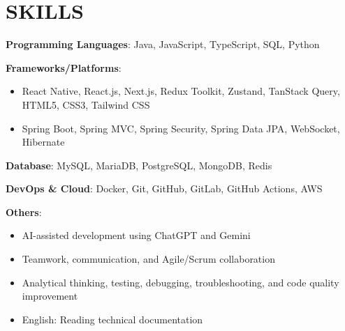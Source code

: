 \section{SKILLS}
\resumeSubHeadingListStart

  \item
    \resumeItemListStart
      \item \textbf{Programming Languages}: Java, JavaScript, TypeScript, SQL, Python
      \item \textbf{Frameworks/Platforms}:
        \begin{itemize}
          \item React Native, React.js, Next.js, Redux Toolkit, Zustand, TanStack Query, HTML5, CSS3, Tailwind CSS
          \item Spring Boot, Spring MVC, Spring Security, Spring Data JPA, WebSocket, Hibernate
        \end{itemize}
      \item \textbf{Database}: MySQL, MariaDB, PostgreSQL, MongoDB, Redis
      \item \textbf{DevOps \& Cloud}: Docker, Git, GitHub, GitLab, GitHub Actions, AWS
      \item \textbf{Others}:
        \begin{itemize}
          \item AI-assisted development using ChatGPT and Gemini
          \item Teamwork, communication, and Agile/Scrum collaboration
          \item Analytical thinking, testing, debugging, troubleshooting, and code quality improvement
          \item English: Reading technical documentation
        \end{itemize}
    \resumeItemListEnd

\resumeSubHeadingListEnd
